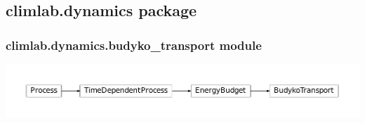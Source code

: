 \documentclass[a4paper,10pt,english]{sphinxmanual}
\begin{document}
\subsection{climlab.dynamics package}
\label{api/climlab.dynamics:climlab-dynamics-package}\label{api/climlab.dynamics::doc}

\subsubsection{climlab.dynamics.budyko\_transport module}
\label{api/climlab.dynamics:climlab-dynamics-budyko-transport-module}
\includegraphics{inheritance-598e25126bb3e29c3e0d23aa40ddae14047c92c2.pdf}
\label{api/climlab.dynamics:module-climlab.dynamics.budyko_transport}
\end{document}
